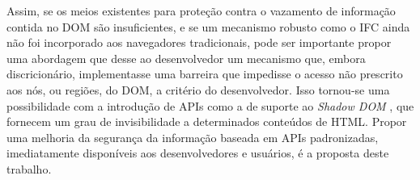 Assim, se os meios existentes para proteção contra o vazamento de informação contida no DOM são insuficientes, e se um mecanismo robusto como o IFC ainda não foi incorporado aos navegadores tradicionais, pode ser importante propor uma abordagem que desse ao desenvolvedor um mecanismo que, embora discricionário, implementasse uma barreira que impedisse o acesso não prescrito aos nós, ou regiões, do DOM, a critério do desenvolvedor. Isso tornou-se uma possibilidade com a introdução de APIs como a de suporte ao \textit{Shadow DOM} \cite{W3C:ShadowDOM}, que fornecem um grau de invisibilidade a determinados conteúdos de HTML. Propor uma melhoria da segurança da informação baseada em APIs padronizadas, imediatamente disponíveis aos desenvolvedores e usuários, é a proposta deste trabalho.